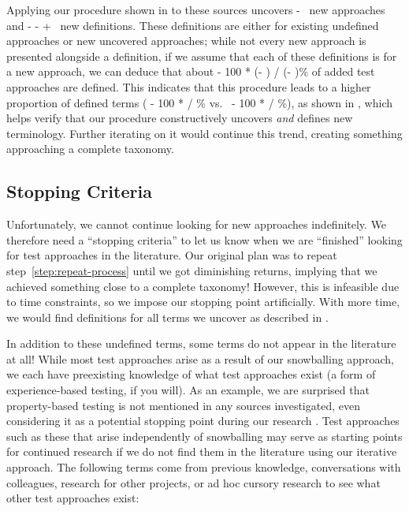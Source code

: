\ifnotpaper
    Applying our procedure shown in  to these sources
    uncovers \the\numexpr \TotalAfter - \TotalBefore\relax\ new approaches and
    \the\numexpr \TotalAfter - \UndefAfter - \TotalBefore + \UndefBefore\relax\ new
    definitions. These definitions are either for existing undefined approaches or
    new uncovered approaches; while not every new approach is presented alongside
    a definition, if we assume that each of these definitions is for a new approach,
    we can deduce that about \the{} - 100 * (\UndefAfter - \UndefBefore) /
    (\TotalAfter - \TotalBefore)\relax\% of added test approaches are defined. This
    indicates that this procedure leads to a higher proportion of defined terms
    (\the{} - 100 * \UndefBefore / \TotalBefore\relax\% vs.~%
    \the{} - 100 * \UndefAfter / \TotalAfter\relax\%), as shown in
    , which helps verify that our procedure constructively
    uncovers \emph{and} defines new terminology. Further iterating on it would
    continue this trend, creating something approaching a complete taxonomy.

    
\fi

\subsection{Stopping Criteria}\label{stop-crit}

Unfortunately, we cannot continue looking for new approaches indefinitely. We
therefore need a ``stopping criteria'' to let us know when we are ``finished''
looking for test approaches in the literature. Our original plan was to repeat
step~\ref{step:repeat-process} until we got diminishing returns, implying that
we achieved something close to a complete taxonomy! However, this is infeasible
due to time constraints, so we impose our stopping point artificially. With
more time, we would find definitions for all terms we uncover as described in
.

\ifnotpaper
    In addition to these undefined terms, some terms do not appear in
    the literature at all! While most test approaches arise as a result of our
    snowballing approach, we each have preexisting knowledge of what test
    approaches exist (a form of experience-based testing, if you will).
    As an example, we are surprised that property-based testing is not mentioned
    in any sources investigated, even considering it as a potential stopping point
    during our research%
    . Test approaches such as these that arise independently of snowballing may
    serve as starting points for continued research if we do not find them in
    the literature using our iterative approach. The following terms come from
    previous knowledge, conversations with colleagues, research for other
    projects, or ad hoc cursory research to see what other test approaches exist:
    \newline

